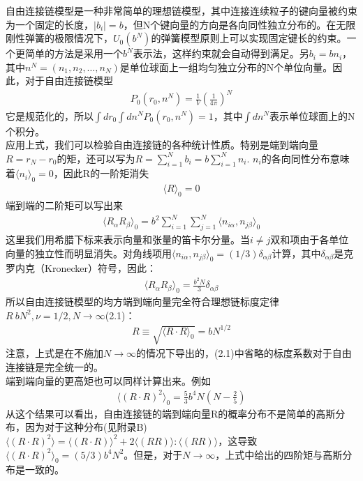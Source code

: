 自由连接链模型是一种非常简单的理想链模型，其中连接连续粒子的键向量被约束为一个固定的长度，$|b_{i}|=b$，但N个键向量的方向是各向同性独立分布的。在无限刚性弹簧的极限情况下，$U_0(b^{N})$的弹簧模型原则上可以实现固定键长的约束。一个更简单的方法是采用一个$b^{N}$表示法，这样约束就会自动得到满足。另$b_{i}=bn_{i}$，其中$n^{N}=(n_1,n_2,\ldots,n_{N})$是单位球面上一组均匀独立分布的N个单位向量。因此，对于自由连接链模型\\
\begin{gather}
P_0(r_0,n^{N})=\frac{1}{V} (\frac{1}{4 \pi})^{N}
\end{gather}
它是规范化的，所以$\int dr_0\int dn^{N}P_0(r_0,n^{N})=1$，其中$\int dn^{N}$表示单位球面上的N个积分。\\
应用上式，我们可以检验自由连接链的各种统计性质。特别是端到端向量$R=r_{N}-r_0$的矩，还可以写为$R=\sum _{i=1}^{N} b_{i}=b \sum _{i=1}^{N} n_{i}$.
$n_{i}$的各向同性分布意味着$\langle n_{i}\rangle _{0}=0$，因此R的一阶矩消失\\
\begin{gather}
\langle R \rangle_{0}=0
\end{gather}
端到端的二阶矩可以写出来\\
\begin{gather}
\langle R_{\alpha} R_{\beta}\rangle_{0}=b^2 \sum _{i=1}^{N} \sum _{j=1}^{N} \langle n_{i \alpha},n_{j \beta} \rangle_{0}
\end{gather}
这里我们用希腊下标来表示向量和张量的笛卡尔分量。当$i\neq j$双和项由于各单位向量的独立性而明显消失。对角线项用$\langle n_{i \alpha},n_{j \beta} \rangle_{0}=(1/3)\delta_{\alpha  \beta }$计算，其中$\delta_{\alpha \beta }$是克罗内克（Kronecker）符号，因此：\\
\begin{gather}
\langle R_{\alpha} R_{\beta}\rangle_{0}=\frac{b^{2}N}{3}\delta_{\alpha \beta }
\end{gather}
所以自由连接链模型的均方端到端向量完全符合理想链标度定律$R~bN^2,\nu=1/2,N \rightarrow \infty $(2.1)：\\
\begin{gather}
R\equiv \sqrt{\langle R \cdot R\rangle _{0}}=bN^{1/2}
\end{gather}
注意，上式是在不施加$N\rightarrow \infty$的情况下导出的，(2.1)中省略的标度系数对于自由连接链是完全统一的。\\

端到端向量的更高矩也可以同样计算出来。例如\\
\begin{gather}
\langle (R \cdot R)^2 \rangle_{0}=\frac{5}{3}b^4N(N-\frac{2}{5})
\end{gather}
从这个结果可以看出，自由连接链的端到端向量R的概率分布不是简单的高斯分布，因为对于这种分布(见附录B)$\langle (R \cdot R)^2 \rangle=\langle (R \cdot R) \rangle^2+2\langle (R R)\rangle:\langle (R R)\rangle$，这导致$\langle (R \cdot R)^2 \rangle_{0}=(5/3)b^4N^2$。但是，对于$N\rightarrow \infty$，上式中给出的四阶矩与高斯分布是一致的。\\

